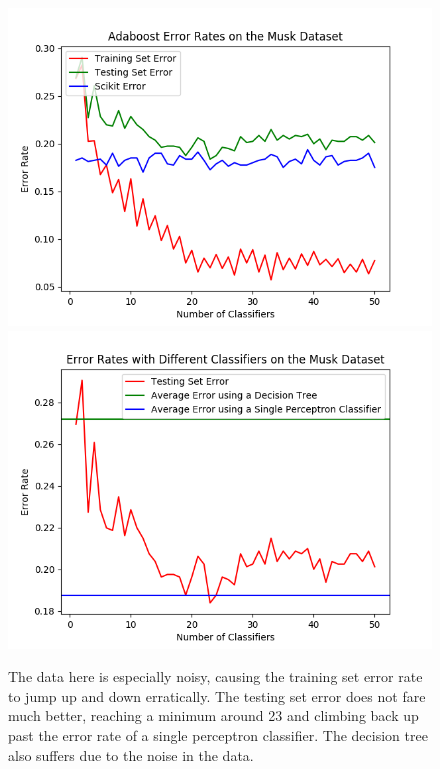 \documentclass{article}
\begin{document}
\begin{figure}[hbt]
\centering
\includegraphics[scale=0.7]{Musk_1}
\includegraphics[scale=0.7]{Musk_different_classifiers_1} 
\caption{The data here is especially noisy, causing the training set error rate to jump up and down erratically. The testing set error does not fare much better, reaching a minimum around 23 and climbing back up past the error rate of a single perceptron classifier. The decision tree also suffers due to the noise in the data.}
\end{figure}
\end{document}
